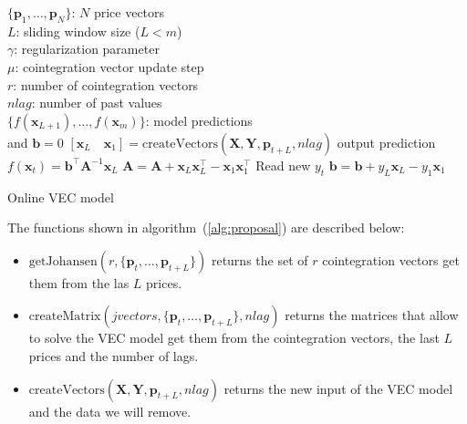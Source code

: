 \begin{algorithm}[ht]
\begin{algorithmic}[1]
\REQUIRE $\,$ \\
$\{\mathbf{p}_1,\dots,\mathbf{p}_N \}$: $N$ price vectors \\
$L$: sliding window size ($L<m$) \\
$\gamma$: regularization parameter \\
$\mu$: cointegration vector update step \\
$r$: number of cointegration vectors \\
$nlag$: number of past values \\
\ENSURE  $\,$ \\
$\{f(\mathbf{x}_{L+1}),\dots,f(\mathbf{x}_m) \}$: model predictions \\
and $\mathbf{b}=0$
	\ELSE
        \STATE $[\mathbf{x}_{L} \quad \mathbf{x}_{1}] =
        \text{createVectors}(\mathbf{X},\mathbf{Y},\mathbf{p}_{t+L},nlag)$
        \STATE output prediction $f(\mathbf{x}_t) =  \mathbf{b}^\intercal
\mathbf{A}^{-1}\mathbf{x}_{L}$
        \STATE $\mathbf{A} = \mathbf{A} + \mathbf{x}_{L} \mathbf{x}_{L}^\intercal-
\mathbf{x}_{1} \mathbf{x}_{1}^\intercal  $
        \STATE Read new $y_t$
        \STATE $\mathbf{b} = \mathbf{b} + y_{L} \mathbf{x}_{L} - y_{1}\mathbf{x}_{1}$
        \ENDIF
\ENDFOR

\end{algorithmic}
\caption{Online VEC model}
\label{alg:proposal}
\end{algorithm}

The functions shown in algorithm~(\ref{alg:proposal}) are described
below:
\begin{itemize}
\item $\text{getJohansen}(r, \{\mathbf{p}_t,\dots,\mathbf{p}_{t+L}
\})$ returns the set of $r$ cointegration vectors get them from the las
$L$ prices.
\item
$\text{createMatrix}(jvectors,\{\mathbf{p}_t,\dots,\mathbf{p}_{t+L}
\},nlag)$ returns the matrices that allow to solve the VEC model get
them from the cointegration vectors, the last $L$ prices and the
number of lags. 
\item
$\text{createVectors}(\mathbf{X},\mathbf{Y},\mathbf{p}_{t+L},nlag)$
returns the new input of the VEC model and the data we will remove.
\end{itemize}

